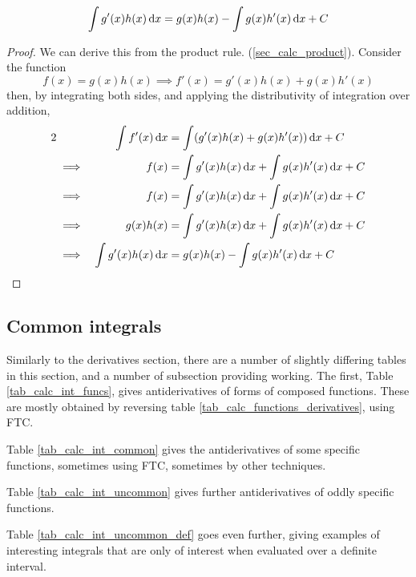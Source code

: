 \begin{theorem}
    \begin{equation*}
        \integ{g'(x)h(x)}{x} = g(x)h(x) - \integ{g(x)h'(x)}{x} + C
    \end{equation*}
\end{theorem}
\begin{proof}
    We can derive this from the product rule.
    (\ref{sec_calc_product}).  Consider the function
    \begin{equation*}
        f(x) = g(x) h(x) \implies f'(x) = g'(x) h(x) + g(x) h'(x)
    \end{equation*}
    then, by integrating both sides, and applying the distributivity of
    integration over addition,
    \begin{alignat*} 2
        && \integ{f'(x)}{x} &= \integ{(g'(x)h(x) + g(x)h'(x))}{x} + C \\
        &\implies& f(x) &= \integ{g'(x)h(x)}{x} + \integ{g(x)h'(x)}{x} + C \\
        &\implies& f(x) &= \integ{g'(x)h(x)}{x} + \integ{g(x)h'(x)}{x} + C \\
        &\implies& g(x)h(x)
            &= \integ{g'(x)h(x)}{x} + \integ{g(x)h'(x)}{x} + C \\
        &\implies& \integ{g'(x)h(x)}{x}
            &= g(x)h(x) - \integ{g(x)h'(x)}{x} + C \qedhere \\
    \end{alignat*}
\end{proof}

\subsection{Common integrals}

Similarly to the derivatives section, there are a number of slightly differing
tables in this section, and a number of subsection providing working. The first,
Table \ref{tab_calc_int_funcs}, gives antiderivatives of forms of composed
functions.  These are mostly obtained by reversing table
\ref{tab_calc_functions_derivatives}, using FTC.

Table \ref{tab_calc_int_common} gives the antiderivatives of some specific
functions, sometimes using FTC, sometimes by other techniques.

Table \ref{tab_calc_int_uncommon} gives further antiderivatives of oddly
specific functions.

Table \ref{tab_calc_int_uncommon_def} goes even further, giving examples of
interesting integrals that are only of interest when evaluated over a definite
interval.

